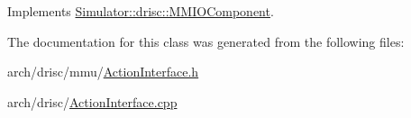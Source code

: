 Implements \hyperlink{class_simulator_1_1drisc_1_1_m_m_i_o_component_aab3662058e7a00109b122a1460188a8b}{Simulator\+::drisc\+::\+M\+M\+I\+O\+Component}.



The documentation for this class was generated from the following files\+:\begin{DoxyCompactItemize}
\item 
arch/drisc/mmu/\hyperlink{_action_interface_8h}{Action\+Interface.\+h}\item 
arch/drisc/\hyperlink{_action_interface_8cpp}{Action\+Interface.\+cpp}\end{DoxyCompactItemize}
